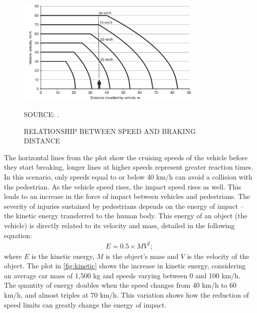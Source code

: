 \begin{figure}[!htbp]
    \centering\footnotesize
    \captionsetup{font=footnotesize}
    \caption{RELATIONSHIP BETWEEN SPEED AND BRAKING DISTANCE}
    \includegraphics[width=0.8\textwidth]{fig/braking2.png}
    \label{fig:braking}
    \par SOURCE: \textcite{Mohan2016a}.
\end{figure} 

The horizontal lines from the plot show the cruising speeds of the vehicle before they start breaking, longer lines at higher speeds represent greater reaction times. In this scenario, only speeds equal to or below 40 km/h can avoid a collision with the pedestrian. As the vehicle speed rises, the impact speed rises as well. This leads to  an increase in the force of impact between vehicles and pedestrians. The severity of injuries sustained by pedestrians depends on the energy of impact – the kinetic energy transferred to the human body. This energy of an object (the vehicle) is directly related to its velocity and mass, detailed in the following equation: \begin{align}
    E = 0.5 \times MV^2 \mbox{;}
    \label{eq:energy}
\end{align} where $E$ is the kinetic energy, $M$ is the object's mass and $V$ is the velocity of the object. The plot in \autoref{fig:kinetic} shows the increase in kinetic energy, considering an average car mass of 1,500 kg \cite{Zervas2008} and speeds varying between 0 and 100 km/h. The quantity of energy doubles when the speed changes from 40 km/h to 60 km/h, and almost triples at 70 km/h. This variation shows how the reduction of speed limits can greatly change the energy of impact.

